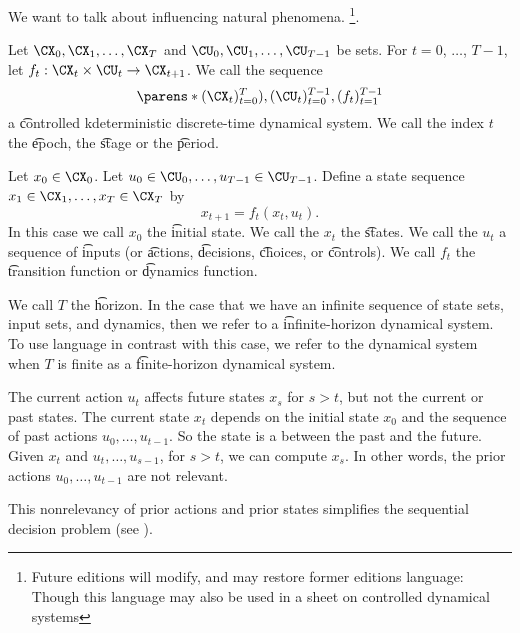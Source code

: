 

We want to talk about influencing natural phenomena.
\footnote{Future editions will modify, and may restore former editions language:  Though this language may also be used in a sheet on  controlled dynamical systems}.


Let $\CX_0, \CX_1, \dots, \CX_{T}$ and $\CU_0, \CU_1, \dots, \CU_{T-1}$ be sets.
For $t = 0$, $\dots$, $T-1$, let $f_{t}: \CX_t \times \CU_t \to \CX_{t+1}$.
We call the sequence
\[
	\parens*{(\CX_t)_{t = 0}^{T}), (\CU_t)_{t=0}^{T-1}, (f_t)_{t=1}^{T-1}}
\]
a \t{controlled kdeterministic discrete-time dynamical system}.
We call the index $t$ the \t{epoch}, the \t{stage} or the \t{period}.

Let $x_0 \in \CX_0$.
Let $u_0 \in \CU_0, \dots, u_{T-1} \in \CU_{T-1}$. Define a state sequence $x_1 \in \CX_1, \dots, x_T \in \CX_T$ by
\[
    x_{t+1} = f_t(x_t, u_t).
\]
In this case we call $x_0$ the \t{initial state}.
We call the $x_t$ the \t{states}.
We call the $u_t$ a sequence of \t{inputs} (or \t{actions}, \t{decisions}, \t{choices}, or \t{controls}).
We call $f_t$ the \t{transition function} or \t{dynamics function}.

We call $T$ the \t{horizon}.
In the case that we have an infinite sequence of state sets, input sets, and dynamics, then we refer to a \t{infinite-horizon} dynamical system.
To use language in contrast with this case, we refer to the dynamical system when $T$ is finite as a \t{finite-horizon} dynamical system.


The current action $u_t$ affects future states $x_{s}$ for $s > t$, but not the current or past states.
The current state $x_t$ depends on the initial state $x_0$ and the sequence of past actions $u_0, \dots, u_{t-1}$.
So the state is a  between the past and the future.
Given $x_t$ and $u_t, \dots, u_{s-1}$, for $s > t$, we can compute $x_s$.
In other words, the prior actions $u_0, \dots, u_{t-1}$ are not relevant.

This nonrelevancy of prior actions and prior states simplifies the sequential decision problem (see ).


